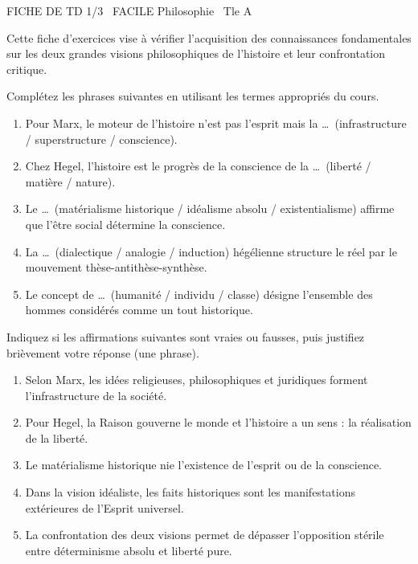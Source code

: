 \documentclass[11pt]{article}
\begin{document}
\begin{tcolorbox}[enhanced,colback=popink,colframe=popink,arc=10pt,boxrule=0pt,left=12pt,right=12pt,top=9pt,bottom=9pt]
{\color{white}\popxbold\small FICHE DE TD 1/3 \textbullet\ FACILE \hfill Philosophie \textbullet\ Tle A\par}
\end{tcolorbox}
\vspace{4pt}
\noindent Cette fiche d'exercices vise à vérifier l'acquisition des connaissances fondamentales sur les deux grandes visions philosophiques de l'histoire et leur confrontation critique.

\begin{exercice}
Complétez les phrases suivantes en utilisant les termes appropriés du cours.
\begin{enumerate}
    \item Pour Marx, le moteur de l'histoire n'est pas l'esprit mais la \dots\ (infrastructure / superstructure / conscience).
    \item Chez Hegel, l'histoire est le progrès de la conscience de la \dots\ (liberté / matière / nature).
    \item Le \dots\ (matérialisme historique / idéalisme absolu / existentialisme) affirme que l'être social détermine la conscience.
    \item La \dots\ (dialectique / analogie / induction) hégélienne structure le réel par le mouvement thèse-antithèse-synthèse.
    \item Le concept de \dots\ (humanité / individu / classe) désigne l'ensemble des hommes considérés comme un tout historique.
\end{enumerate}
\end{exercice}

\begin{exercice}
Indiquez si les affirmations suivantes sont vraies ou fausses, puis justifiez brièvement votre réponse (une phrase).
\begin{enumerate}
    \item Selon Marx, les idées religieuses, philosophiques et juridiques forment l'infrastructure de la société.
    \item Pour Hegel, la Raison gouverne le monde et l'histoire a un sens : la réalisation de la liberté.
    \item Le matérialisme historique nie l'existence de l'esprit ou de la conscience.
    \item Dans la vision idéaliste, les faits historiques sont les manifestations extérieures de l'Esprit universel.
    \item La confrontation des deux visions permet de dépasser l'opposition stérile entre déterminisme absolu et liberté pure.
\end{enumerate}
\end{exercice}
\end{document}
